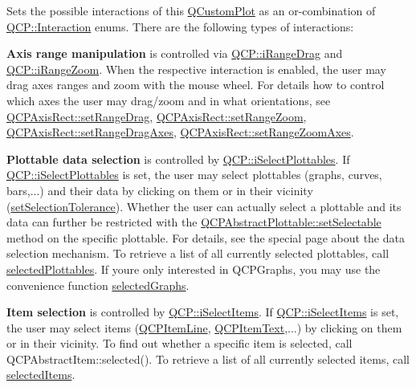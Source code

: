 Sets the possible interactions of this \hyperlink{class_q_custom_plot}{Q\+Custom\+Plot} as an or-\/combination of \hyperlink{namespace_q_c_p_a2ad6bb6281c7c2d593d4277b44c2b037}{Q\+C\+P\+::\+Interaction} enums. There are the following types of interactions\+:

{\bfseries Axis range manipulation} is controlled via \hyperlink{namespace_q_c_p_a2ad6bb6281c7c2d593d4277b44c2b037a2c4432b9aceafb94000be8d1b589ef18}{Q\+C\+P\+::i\+Range\+Drag} and \hyperlink{namespace_q_c_p_a2ad6bb6281c7c2d593d4277b44c2b037abee1e94353525a636aeaf0ba32b72e14}{Q\+C\+P\+::i\+Range\+Zoom}. When the respective interaction is enabled, the user may drag axes ranges and zoom with the mouse wheel. For details how to control which axes the user may drag/zoom and in what orientations, see \hyperlink{class_q_c_p_axis_rect_ae6aef2f7211ba6097c925dcd26008418}{Q\+C\+P\+Axis\+Rect\+::set\+Range\+Drag}, \hyperlink{class_q_c_p_axis_rect_a7960a9d222f1c31d558b064b60f86a31}{Q\+C\+P\+Axis\+Rect\+::set\+Range\+Zoom}, \hyperlink{class_q_c_p_axis_rect_a648cce336bd99daac4a5ca3e5743775d}{Q\+C\+P\+Axis\+Rect\+::set\+Range\+Drag\+Axes}, \hyperlink{class_q_c_p_axis_rect_a9442cca2aa358405f39a64d51eca13d2}{Q\+C\+P\+Axis\+Rect\+::set\+Range\+Zoom\+Axes}.

{\bfseries Plottable data selection} is controlled by \hyperlink{namespace_q_c_p_a2ad6bb6281c7c2d593d4277b44c2b037a67148c8227b4155eca49135fc274c7ec}{Q\+C\+P\+::i\+Select\+Plottables}. If \hyperlink{namespace_q_c_p_a2ad6bb6281c7c2d593d4277b44c2b037a67148c8227b4155eca49135fc274c7ec}{Q\+C\+P\+::i\+Select\+Plottables} is set, the user may select plottables (graphs, curves, bars,...) and their data by clicking on them or in their vicinity (\hyperlink{class_q_custom_plot_a4dc31241d7b09680950e19e5f971ed93}{set\+Selection\+Tolerance}). Whether the user can actually select a plottable and its data can further be restricted with the \hyperlink{class_q_c_p_abstract_plottable_ac238d6e910f976f1f30d41c2bca44ac3}{Q\+C\+P\+Abstract\+Plottable\+::set\+Selectable} method on the specific plottable. For details, see the special page about the data selection mechanism. To retrieve a list of all currently selected plottables, call \hyperlink{class_q_custom_plot_a747faaab57c56891e901a1e97fa4359a}{selected\+Plottables}. If you\textquotesingle{}re only interested in Q\+C\+P\+Graphs, you may use the convenience function \hyperlink{class_q_custom_plot_ad3547aded026d8a9ae6ef13a69080d06}{selected\+Graphs}.

{\bfseries Item selection} is controlled by \hyperlink{namespace_q_c_p_a2ad6bb6281c7c2d593d4277b44c2b037aea2f7c105d674e76d9b187b02ef29260}{Q\+C\+P\+::i\+Select\+Items}. If \hyperlink{namespace_q_c_p_a2ad6bb6281c7c2d593d4277b44c2b037aea2f7c105d674e76d9b187b02ef29260}{Q\+C\+P\+::i\+Select\+Items} is set, the user may select items (\hyperlink{class_q_c_p_item_line}{Q\+C\+P\+Item\+Line}, \hyperlink{class_q_c_p_item_text}{Q\+C\+P\+Item\+Text},...) by clicking on them or in their vicinity. To find out whether a specific item is selected, call Q\+C\+P\+Abstract\+Item\+::selected(). To retrieve a list of all currently selected items, call \hyperlink{class_q_custom_plot_afda487bcf2d6cf1a57173d82495e29ba}{selected\+Items}.


